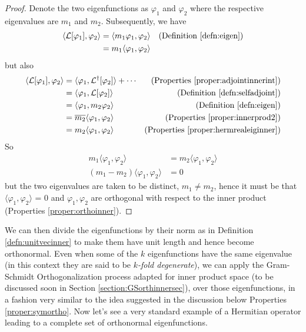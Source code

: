 \begin{proof}
Denote the two eigenfunctions as $\varphi_1$ and $\varphi_2$ where the respective eigenvalues are $m_1$ and $m_2$. Subsequently, we have
\begin{align*}
\langle \mathcal{L}[\varphi_1], \varphi_2 \rangle &= \langle m_1\varphi_1, \varphi_2 \rangle & \text{(Definition \ref{defn:eigen})} \\
&= m_1 \langle \varphi_1, \varphi_2 \rangle 
\end{align*}
but also
\begin{align*}
\langle \mathcal{L}[\varphi_1], \varphi_2 \rangle &= \langle \varphi_1, \mathcal{L}^\dag[\varphi_2] \rangle + \cdots & \text{(Properties \ref{proper:adjointinnerint})} \\
&= \langle \varphi_1, \mathcal{L}[\varphi_2] \rangle & \text{(Definition \ref{defn:selfadjoint})} \\
&= \langle \varphi_1, m_2\varphi_2 \rangle & \text{(Definition \ref{defn:eigen})} \\
&= \overline{m_2} \langle \varphi_1, \varphi_2 \rangle & \text{(Properties \ref{proper:innerprod2})} \\
&= m_2 \langle \varphi_1, \varphi_2 \rangle & \text{(Properties \ref{proper:hermrealeiginner})}
\end{align*}
So
\begin{align*}
m_1 \langle \varphi_1, \varphi_2 \rangle &= m_2 \langle \varphi_1, \varphi_2 \rangle \\
(m_1 - m_2) \langle \varphi_1, \varphi_2 \rangle &= 0
\end{align*}
but the two eigenvalues are taken to be distinct, $m_1 \neq m_2$, hence it must be that $\langle \varphi_1, \varphi_2 \rangle$ = 0 and $\varphi_1, \varphi_2$ are orthogonal with respect to the inner product (Properties \ref{proper:orthoinner}).
\end{proof}
We can then divide the eigenfunctions by their norm as in Definition \ref{defn:unitvecinner} to make them have unit length and hence become orthonormal. Even when some of the $k$ eigenfunctions have the same eigenvalue (in this context they are said to be \textit{$k$-fold degenerate}), we can apply the Gram-Schmidt Orthogonalization process adapted for inner product space (to be discussed soon in Section \ref{section:GSorthinnersec}), over those eigenfunctions, in a fashion very similar to the idea suggested in the discussion below Properties \ref{proper:symortho}. Now let's see a very standard example of a Hermitian operator leading to a complete set of orthonormal eigenfunctions.
